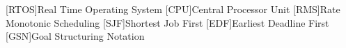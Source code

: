 [RTOS]{Real Time Operating System}
[CPU]{Central Processor Unit}
[RMS]{Rate Monotonic Scheduling}
[SJF]{Shortest Job First}
[EDF]{Earliest Deadline First}
[GSN]{Goal Structuring Notation}